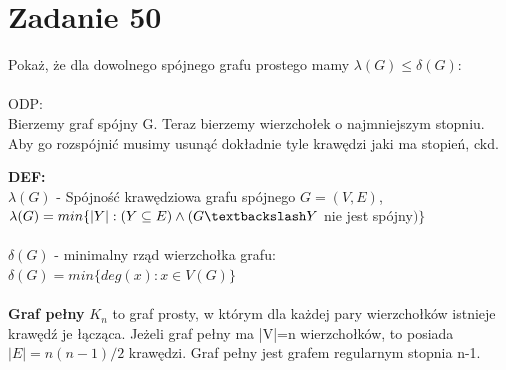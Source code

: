 \documentclass{article}
\begin{document}
\section{\centering Zadanie 50}
Pokaż, że dla dowolnego spójnego grafu prostego mamy $\lambda(G) \leq \delta(G)$: \\\\
ODP: \\
Bierzemy graf spójny G. Teraz bierzemy wierzchołek o najmniejszym stopniu. Aby go rozspójnić musimy usunąć dokładnie tyle krawędzi jaki ma stopień, ckd.

\noindent \textbf{DEF:} \\
$\lambda(G)$ - Spójność krawędziowa grafu spójnego $G=(V,E)$, \\ 
\indent $\lambda(G) = min \{|Y|: (Y \subseteq E) \land (G\textbackslash Y$ nie jest spójny$)\}$\\\\
$\delta(G)$ - minimalny rząd wierzchołka grafu:\\
\indent $\delta(G) = min\{deg(x) : x \in V(G)\}$\\\\
\textbf{Graf pełny} $K_n$  to graf prosty, w którym dla każdej pary wierzchołków istnieje krawędź je łącząca. Jeżeli graf pełny ma |V|=n wierzchołków, to posiada $|E|=n(n-1)/2$ krawędzi. Graf pełny jest grafem regularnym stopnia n-1.\\
\end{document}
